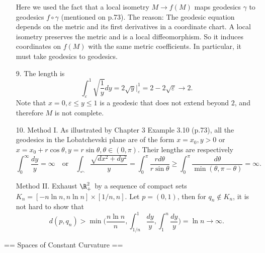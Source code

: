 \begin{itemize}
    Here we used the fact that a local isometry $M\to f(M)$ 
    maps geodesics $\gamma$ to geodesics $f\circ\gamma$ (mentioned on p.73). 
    The reason: The geodesic equation depends on the metric 
    and its first derivatives in a coordinate chart. 
    A local isometry preserves the metric and is a local diffeomorphism. 
    So it induces coordinates on $f(M)$ with the same metric coefficients. 
    In particular, it must take geodesics to geodesics.

    \item[9.] The length is
    \[\int_\varepsilon^1\sqrt{\frac{1}{y}}dy
    =2\sqrt{y}\big|_\varepsilon^1=2-2\sqrt{\varepsilon}\to2.\]
    Note that $x=0,\varepsilon\le y\le1$ is a geodesic 
    that does not extend beyond $2$, and therefore $M$ is not complete.

    \item[10.] Method I. As illustrated by Chapter 3 Example 3.10 (p.73), 
    all the geodesics in the Lobatchevski plane are of the form $x=x_0,y>0$ 
    or $x=x_0+r\cos\theta,y=r\sin\theta,\theta\in(0,\pi)$. 
    Their lengths are respectively
    \[\int_0^\infty\frac{dy}{y}=\infty \quad\text{or}\quad 
    \int_\curvearrowleft\frac{\sqrt{dx^2+dy^2}}{y}
    =\int_0^\pi\frac{rd\theta}{r\sin\theta}
    \ge\int_0^\pi\frac{d\theta}{\min(\theta,\pi-\theta)}=\infty.\]

    Method II. Exhaust $\R^2_+$ by a sequence of compact sets 
    $K_n=[-n\ln n,n\ln n]\times[1/n,n]$. Let $p=(0,1)$, 
    then for $q_n\notin K_n$, it is not hard to show that
    \[d(p,q_n)>\min\bigg(\frac{n\ln n}{n},\int_{1/n}^1\frac{dy}{y},
    \int_1^n\frac{dy}{y}\bigg)=\ln n\to\infty.\]
\end{itemize}

== Spaces of Constant Curvature ==

